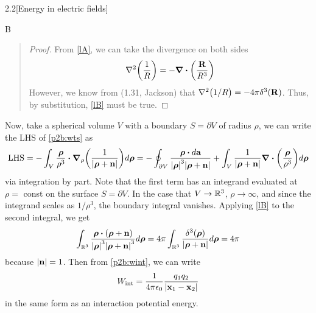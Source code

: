 \documentclass[12pt]{article}
\begin{document}
\begin{problem}{2.2}[Energy in electric fields]
\begin{solution}
\begin{lemma}{B}
\end{lemma}
\begin{quote}
\begin{proof}
    From \eqref{lA}, we can take the divergence on both sides
    \begin{equation*}
        \laplacian\qty(\frac1R)=-\div{\qty(\frac{\vb{R}}{R^3})} 
    \end{equation*}
    However, we know from (1.31, Jackson) that
    $\laplacian{\qty(1/R)}=-4\pi\delta^3(\vb{R})$. Thus, by substitution,
    \eqref{lB} must be true.
\end{proof} 
\end{quote}

Now, take a spherical volume $V$ with a boundary $S=\partial V$ of radius
$\rho$, we can write the LHS of \eqref{p2b:wts} as
\begin{align}
    \text{LHS}
    =-\int_V
    \frac{\bm\rho}{\rho^3}\vdot\grad_\rho\qty(\frac1{\abs{\bm\rho+\vb{n}}})d\bm\rho
    =-\oint_{\partial V}\frac{\bm\rho\vdot
    d\vb{a}}{\abs{\bm\rho}^3\abs{\bm\rho+\vb{n}}}
+\int_V\frac1{\abs{\bm\rho+\vb{n}}}\div{\qty(\frac{\bm\rho}{\rho^3})}d\bm\rho
\end{align}
via integration by part. Note that the first term has an integrand
evaluated at $\rho=$ const on the surface $S=\partial V$. In the case that
$V\to\mathbb{R}^3$, $\rho\to\infty$, and since the integrand scales as $1/\rho^3$, the
boundary integral vanishes. Applying \eqref{lB} to the second integral, we get
\begin{equation}
    \int_{\R^3} \frac{\bm\rho\vdot(\bm\rho+\vb{n})}
        {\abs{\bm\rho}^3\abs{\bm\rho+\vb{n}}^3}d\bm\rho
    =4\pi\int_{\R^3}\frac{\delta^3(\bm\rho)}{\abs{\bm\rho+\vb{n}}}d\bm\rho
    =4\pi
\end{equation}
because $\abs{\vb{n}}=1$. Then from \eqref{p2b:wint}, we can write
\begin{equation}
    W_{\text{int}}=\frac1{4\pi\epsilon_0}\frac{q_1q_2}{\abs{\vb{x}_1-\vb{x}_2}} 
\end{equation}
in the same form as an interaction potential energy.


\end{solution}
 
\end{problem}

\end{document}
